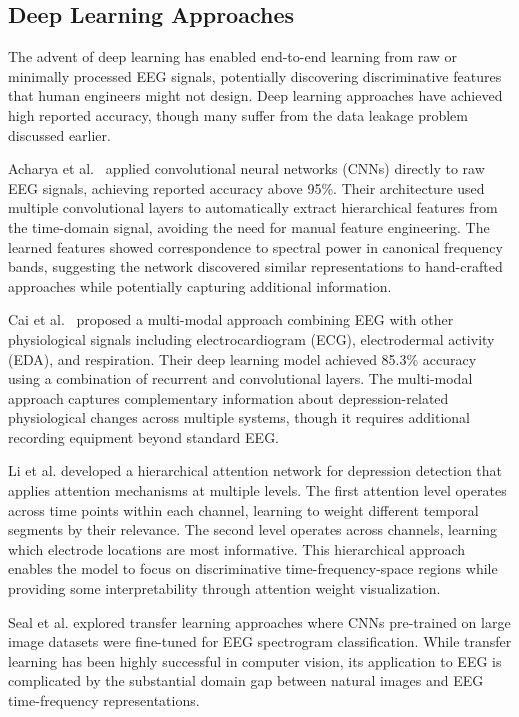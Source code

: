 \documentclass[blue,fullpaper]{ludusofficial}  %
\begin{document}
\subsection{Deep Learning Approaches}

The advent of deep learning has enabled end-to-end learning from raw or minimally processed EEG signals, potentially discovering discriminative features that human engineers might not design. Deep learning approaches have achieved high reported accuracy, though many suffer from the data leakage problem discussed earlier.

Acharya et al.~\cite{acharya2018automated} applied convolutional neural networks (CNNs) directly to raw EEG signals, achieving reported accuracy above 95\%. Their architecture used multiple convolutional layers to automatically extract hierarchical features from the time-domain signal, avoiding the need for manual feature engineering. The learned features showed correspondence to spectral power in canonical frequency bands, suggesting the network discovered similar representations to hand-crafted approaches while potentially capturing additional information.

Cai et al.~\cite{cai2020pervasive} proposed a multi-modal approach combining EEG with other physiological signals including electrocardiogram (ECG), electrodermal activity (EDA), and respiration. Their deep learning model achieved 85.3\% accuracy using a combination of recurrent and convolutional layers. The multi-modal approach captures complementary information about depression-related physiological changes across multiple systems, though it requires additional recording equipment beyond standard EEG.

Li et al. developed a hierarchical attention network for depression detection that applies attention mechanisms at multiple levels. The first attention level operates across time points within each channel, learning to weight different temporal segments by their relevance. The second level operates across channels, learning which electrode locations are most informative. This hierarchical approach enables the model to focus on discriminative time-frequency-space regions while providing some interpretability through attention weight visualization.

Seal et al. explored transfer learning approaches where CNNs pre-trained on large image datasets were fine-tuned for EEG spectrogram classification. While transfer learning has been highly successful in computer vision, its application to EEG is complicated by the substantial domain gap between natural images and EEG time-frequency representations.
\end{document}
